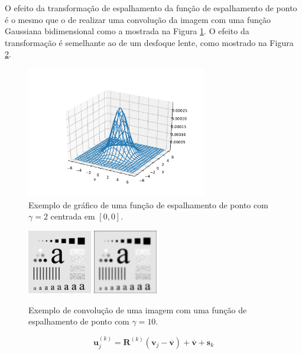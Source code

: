 \documentclass[12pt,openright,oneside,a4paper,english,brazil]{abntex2}
\begin{document}
O efeito da transformação de espalhamento da função de espalhamento de ponto é o mesmo que o de realizar uma convolução da imagem com uma função Gaussiana bidimensional como a mostrada na Figura \ref{fig:psfplot}.
O efeito da transformação é semelhante ao de um desfoque lente, como mostrado na Figura \ref{fig:psfexample}.


\begin{figure}[h]
	\centering
	\includegraphics[width = 0.7\textwidth]{./figures/psf1.pdf}
	\caption{Exemplo de gráfico de uma função de espalhamento de ponto com $\gamma = 2$ centrada em $[0,0]$.}
	\label{fig:psfplot}
\end{figure}

\begin{figure}
	\centering
	\includegraphics[width = 0.25\textwidth]{./figures/psfexample0.png}
	\includegraphics[width = 0.25\textwidth]{./figures/psfexample1.png}
	\caption{Exemplo de convolução de uma imagem com uma função de espalhamento de ponto com $\gamma = 10$.}
	\label{fig:psfexample}
\end{figure}

\begin{equation}
	\label{eq:psfcenter}
	\mathbf{u}^{(k)}_j = \mathbf{R}^{(k)}(\mathbf{v}_j-\mathbf{\overline{v}})+\mathbf{\overline{v}}+\mathbf{s}_k
\end{equation}
\end{document}
